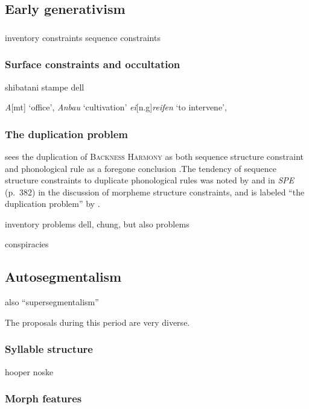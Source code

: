 \subsection{Early generativism}

\subsubsection{\citealt{Stanley1967}}

inventory constraints
sequence constraints

\subsubsection{Surface constraints and occultation}

shibatani
stampe
dell

\emph{A}[mt] `office', \emph{Anbau} `cultivation'
\emph{ei}[n.g]\emph{reifen} `to intervene',

\subsubsection{The duplication problem}

\citeauthor{Anderson1974} sees the duplication of \textsc{Backness Harmony} as both sequence structure constraint and phonological rule as a foregone conclusion
.The tendency of sequence structure constraints to duplicate phonological rules was noted by \citet[][401f.]{Stanley1967} and in \emph{SPE} (p.~382) in the discussion of morpheme structure constraints, and is labeled ``the duplication problem'' by \citet[][?]{Kenstowicz1977}.

inventory problems 
dell, chung, but also problems

conspiracies

\subsection{Autosegmentalism}

also ``supersegmentalism''

The proposals during this period are very diverse. 

\subsubsection{Syllable structure}

hooper
noske

\subsubsection{Morph features}

